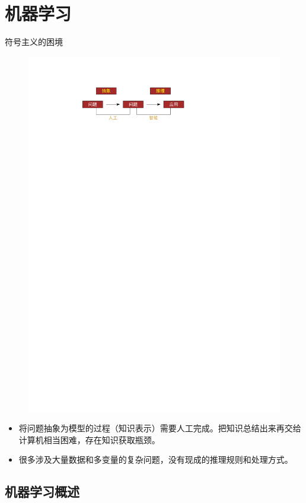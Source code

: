 \section{机器学习}
\textcolor{main1}{符号主义的困境}
\begin{figure}[htbp]
    \centering
    \includegraphics{image/符号主义的困境.pdf}
\end{figure}
\begin{itemize}
    \item 将问题抽象为模型的过程（知识表示）需要人工完成。把知识总结出来再交给计算机相当困难，存在知识获取瓶颈。
    \item \textcolor{main1}{很多涉及大量数据和多变量的复杂问题，没有现成的推理规则和处理方式。}
\end{itemize}

\subsection{机器学习概述}
